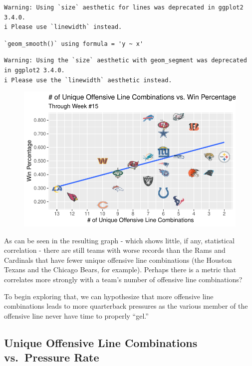 \documentclass[
  letterpaper,
]{krantz}
\begin{document}
\begin{verbatim}
Warning: Using `size` aesthetic for lines was deprecated in ggplot2 3.4.0.
i Please use `linewidth` instead.
\end{verbatim}

\begin{verbatim}
`geom_smooth()` using formula = 'y ~ x'
\end{verbatim}

\begin{verbatim}
Warning: Using the `size` aesthetic with geom_segment was deprecated in ggplot2 3.4.0.
i Please use the `linewidth` aesthetic instead.
\end{verbatim}

\begin{figure}[H]

{\centering \includegraphics{01-nfl-analytics-and-r_files/figure-pdf/plot-combos-1.pdf}

}

\end{figure}

As can be seen in the resulting graph - which shows little, if any,
statistical correlation - there are still teams with worse records than
the Rams and Cardinals that have fewer unique offensive line
combinations (the Houston Texans and the Chicago Bears, for example).
Perhaps there is a metric that correlates more strongly with a team's
number of offensive line combinations?

To begin exploring that, we can hypothesize that more offensive line
combinations leads to more quarterback pressures as the various member
of the offensive line never have time to properly ``gel.''

\hypertarget{unique-offensive-line-combinations-vs.-pressure-rate}{%
\subsection{Unique Offensive Line Combinations vs.~Pressure
Rate}\label{unique-offensive-line-combinations-vs.-pressure-rate}}
\end{document}
